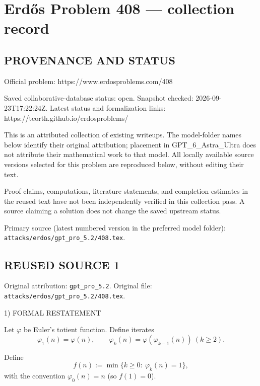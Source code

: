 \section*{Erd\H{o}s Problem 408 --- collection record}

\subsection*{PROVENANCE AND STATUS}
Official problem: https://www.erdosproblems.com/408

Saved collaborative-database status: open.
Snapshot checked: 2026-09-23T17:22:24Z.
Latest status and formalization links: https://teorth.github.io/erdosproblems/

This is an attributed collection of existing writeups. The model-folder names below identify their original attribution; placement in GPT\_6\_Astra\_Ultra does not attribute their mathematical work to that model. All locally available source versions selected for this problem are reproduced below, without editing their text.

Proof claims, computations, literature statements, and completion estimates in the reused text have not been independently verified in this collection pass. A source claiming a solution does not change the saved upstream status.

Primary source (latest numbered version in the preferred model folder): \texttt{attacks/erdos/gpt\_pro\_5.2/408.tex}.

\subsection*{REUSED SOURCE 1}
Original attribution: \texttt{gpt\_pro\_5.2}.
Original file: \texttt{attacks/erdos/gpt\_pro\_5.2/408.tex}.


1) FORMAL RESTATEMENT

Let $\varphi$ be Euler's totient function. Define iterates
\[
\varphi_1(n)=\varphi(n),\qquad \varphi_{k}(n)=\varphi(\varphi_{k-1}(n))\ (k\ge 2).
\]

Define
\[
 f(n):=\min\{k\ge 0:\ \varphi_k(n)=1\},
\]
with the convention $\varphi_0(n)=n$ (so $f(1)=0$).

